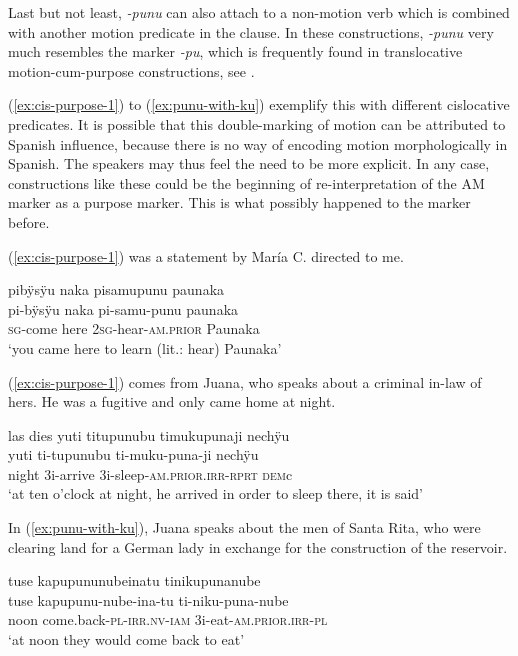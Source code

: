Last but not least, \textit{-punu} can also attach to a non-motion verb which is combined with another motion predicate in the clause. In these constructions, \textit{-punu} very much resembles the  marker \textit{-pu}, which is frequently found in translocative motion-cum-purpose constructions, see . 

(\ref{ex:cis-purpose-1}) to (\ref{ex:punu-with-ku}) exemplify this with different cislocative predicates. It is possible that this double-marking of motion can be attributed to Spanish influence, because there is no way of encoding motion morphologically in Spanish. The speakers may thus feel the need to be more explicit. In any case, constructions like these could be the beginning of re-interpretation of the AM marker as a purpose marker. This is what possibly happened to the  marker before.

(\ref{ex:cis-purpose-1}) was a statement by María C. directed to me.

\ea\label{ex:cis-purpose-1}
\begingl 
\glpreamble pibÿsÿu naka pisamupunu paunaka\\
\gla pi-bÿsÿu naka pi-samu-punu paunaka\\ 
\textsc{sg}-come here 2\textsc{sg}-hear-\textsc{am.prior} Paunaka\\ 
\glft ‘you came here to learn (lit.: hear) Paunaka’\\ 
\endgl
\trailingcitation{[uxx-p110825l.036]}
\xe

(\ref{ex:cis-purpose-1}) comes from Juana, who speaks about a criminal in-law of hers. He was a fugitive and only came home at night.

\ea\label{ex:cis-purpose-2}
\begingl 
\glpreamble las dies yuti titupunubu timukupunaji nechÿu\\
 yuti ti-tupunubu ti-muku-puna-ji nechÿu\\ 
 night 3i-arrive 3i-sleep-\textsc{am.prior.irr}-\textsc{rprt} \textsc{dem}c\\ 
\glft ‘at ten o’clock at night, he arrived in order to sleep there, it is said’\\ 
\endgl
\trailingcitation{[jxx-p120430l-2.115]}
\xe

In (\ref{ex:punu-with-ku}), Juana speaks about the men of Santa Rita, who were clearing land for a German lady in exchange for the construction of the reservoir.

\ea\label{ex:punu-with-ku}
\begingl 
\glpreamble tuse kapupununubeinatu tinikupunanube\\
\gla tuse kapupunu-nube-ina-tu ti-niku-puna-nube\\ 
\glb noon come.back-\textsc{pl}-\textsc{irr.nv}-\textsc{iam} 3i-eat-\textsc{am.prior.irr}-\textsc{pl}\\ 
\glft ‘at noon they would come back to eat’\\ 
\endgl
\trailingcitation{[jxx-p120515l-2.187]}
\xe


